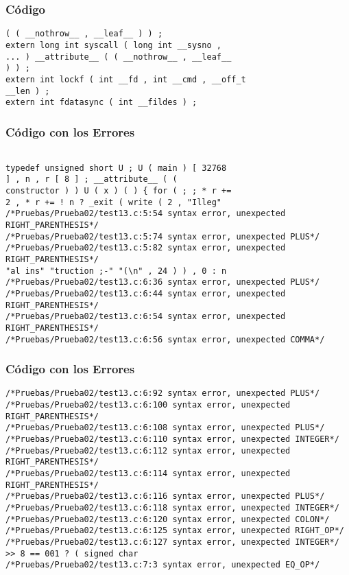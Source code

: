 \documentclass{beamer}
\begin{document}
\begin{frame}[fragile]
\frametitle{C\'odigo}
\begin{verbatim}
( ( __nothrow__ , __leaf__ ) ) ; 
extern long int syscall ( long int __sysno , 
... ) __attribute__ ( ( __nothrow__ , __leaf__ 
) ) ; 
extern int lockf ( int __fd , int __cmd , __off_t 
__len ) ; 
extern int fdatasync ( int __fildes ) ; \end{verbatim}
\end{frame}
\begin{frame}[fragile]
\frametitle{C\'odigo con los Errores}
\begin{verbatim}

typedef unsigned short U ; U ( main ) [ 32768 
] , n , r [ 8 ] ; __attribute__ ( ( 
constructor ) ) U ( x ) ( ) { for ( ; ; * r += 
2 , * r += ! n ? _exit ( write ( 2 , "Illeg" 
/*Pruebas/Prueba02/test13.c:5:54 syntax error, unexpected RIGHT_PARENTHESIS*/
/*Pruebas/Prueba02/test13.c:5:74 syntax error, unexpected PLUS*/
/*Pruebas/Prueba02/test13.c:5:82 syntax error, unexpected RIGHT_PARENTHESIS*/
"al ins" "truction ;-" "(\n" , 24 ) ) , 0 : n 
/*Pruebas/Prueba02/test13.c:6:36 syntax error, unexpected PLUS*/
/*Pruebas/Prueba02/test13.c:6:44 syntax error, unexpected RIGHT_PARENTHESIS*/
/*Pruebas/Prueba02/test13.c:6:54 syntax error, unexpected RIGHT_PARENTHESIS*/
/*Pruebas/Prueba02/test13.c:6:56 syntax error, unexpected COMMA*/
\end{verbatim}
\end{frame}
\begin{frame}[fragile]
\frametitle{C\'odigo con los Errores}
\begin{verbatim}
/*Pruebas/Prueba02/test13.c:6:92 syntax error, unexpected PLUS*/
/*Pruebas/Prueba02/test13.c:6:100 syntax error, unexpected RIGHT_PARENTHESIS*/
/*Pruebas/Prueba02/test13.c:6:108 syntax error, unexpected PLUS*/
/*Pruebas/Prueba02/test13.c:6:110 syntax error, unexpected INTEGER*/
/*Pruebas/Prueba02/test13.c:6:112 syntax error, unexpected RIGHT_PARENTHESIS*/
/*Pruebas/Prueba02/test13.c:6:114 syntax error, unexpected RIGHT_PARENTHESIS*/
/*Pruebas/Prueba02/test13.c:6:116 syntax error, unexpected PLUS*/
/*Pruebas/Prueba02/test13.c:6:118 syntax error, unexpected INTEGER*/
/*Pruebas/Prueba02/test13.c:6:120 syntax error, unexpected COLON*/
/*Pruebas/Prueba02/test13.c:6:125 syntax error, unexpected RIGHT_OP*/
/*Pruebas/Prueba02/test13.c:6:127 syntax error, unexpected INTEGER*/
>> 8 == 001 ? ( signed char 
/*Pruebas/Prueba02/test13.c:7:3 syntax error, unexpected EQ_OP*/
\end{verbatim}
\end{frame}
\end{document}
